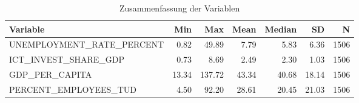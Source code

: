 \begin{table}[!h]
\centering
\caption{Zusammenfassung der Variablen}
\centering
\begin{tabular}[t]{lrrrrrr}
\toprule
Variable & Min & Max & Mean & Median & SD & N\\
\midrule
UNEMPLOYMENT\_RATE\_PERCENT & 0.82 & 49.89 & 7.79 & 5.83 & 6.36 & 1506\\
ICT\_INVEST\_SHARE\_GDP & 0.73 & 8.69 & 2.49 & 2.30 & 1.03 & 1506\\
GDP\_PER\_CAPITA & 13.34 & 137.72 & 43.34 & 40.68 & 18.14 & 1506\\
PERCENT\_EMPLOYEES\_TUD & 4.50 & 92.20 & 28.61 & 20.45 & 21.03 & 1506\\
\bottomrule
\end{tabular}
\end{table}
